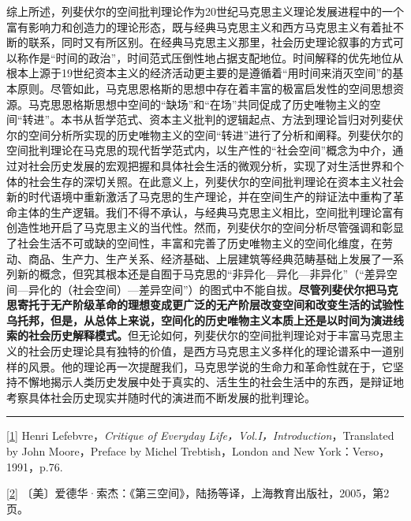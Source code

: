 \documentclass[UTF8, fontset = sourcesans, a4paper, oneside, zihao =
-4, scheme=chinese, no-math, space=true]{ctexbook}
\begin{document}
综上所述，列斐伏尔的空间批判理论作为20世纪马克思主义理论发展进程中的一个富有影响力和创造力的理论形态，既与经典马克思主义和西方马克思主义有着扯不断的联系，同时又有所区别。在经典马克思主义那里，社会历史理论叙事的方式可以称作是``时间的政治''，时间范式压倒性地占据支配地位。时间解释的优先地位从根本上源于19世纪资本主义的经济活动更主要的是遵循着``用时间来消灭空间''的基本原则。尽管如此，马克思恩格斯的思想中存在着丰富的极富启发性的空间思想资源。马克思恩格斯思想中空间的``缺场''和``在场''共同促成了历史唯物主义的空间``转进''。本书从哲学范式、资本主义批判的逻辑起点、方法到理论旨归对列斐伏尔的空间分析所实现的历史唯物主义的空间``转进''进行了分析和阐释。列斐伏尔的空间批判理论在马克思的现代哲学范式内，以生产性的``社会空间''概念为中介，通过对社会历史发展的宏观把握和具体社会生活的微观分析，实现了对生活世界和个体的社会生存的深切关照。在此意义上，列斐伏尔的空间批判理论在资本主义社会新的时代语境中重新激活了马克思的生产理论，并在空间生产的辩证法中重构了革命主体的生产逻辑。我们不得不承认，与经典马克思主义相比，空间批判理论富有创造性地开启了马克思主义的当代性。然而，列斐伏尔的空间分析尽管强调和彰显了社会生活不可或缺的空间性，丰富和完善了历史唯物主义的空间化维度，在劳动、商品、生产力、生产关系、经济基础、上层建筑等经典范畴基础上发展了一系列新的概念，但究其根本还是自囿于马克思的``非异化---异化---非异化''（``差异空间---异化的（社会空间）---差异空间''）的图式中不能自拔。\textbf{尽管列斐伏尔把马克思寄托于无产阶级革命的理想变成更广泛的无产阶层改变空间和改变生活的试验性乌托邦，但是，从总体上来说，空间化的历史唯物主义本质上还是以时间为演进线索的社会历史解释模式。}但无论如何，列斐伏尔的空间批判理论对于丰富马克思主义的社会历史理论具有独特的价值，是西方马克思主义多样化的理论谱系中一道别样的风景。他的理论再一次提醒我们，马克思学说的生命力和革命性就在于，它坚持不懈地揭示人类历史发展中处于真实的、活生生的社会生活中的东西，是辩证地考察具体社会历史现实并随时代的演进而不断发展的批判理论。

\begin{center}\rule{0.5\linewidth}{\linethickness}\end{center}

\protect\hypertarget{part0010_split_002.htmlux5cux23m1}{}{}\protect\hyperlink{part0010_split_001.htmlux5cux23w1}{{[}1{]}}
Henri Lefebvre，\emph{Critique of Everyday
Life，Vol.I，Introduction}，Translated by John Moore，Preface by Michel
Trebtish，London and New York：Verso，1991，p.76.

\protect\hypertarget{part0010_split_002.htmlux5cux23m2}{}{}\protect\hyperlink{part0010_split_001.htmlux5cux23w2}{{[}2{]}}
〔美〕爱德华·索杰：《第三空间》，陆扬等译，上海教育出版社，2005，第2页。
\end{document}
